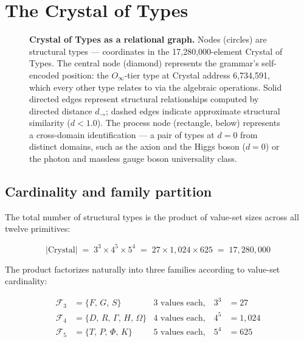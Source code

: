 \documentclass[12pt,a4paper]{article}
\begin{document}
\section{The Crystal of Types}
\label{sec:crystal}

\begin{figure}[H]
\centering
{}
\caption{\textbf{Crystal of Types as a relational graph.} Nodes
(circles) are structural types --- coordinates in the 17,280,000-element
Crystal of Types. The central node (diamond) represents the grammar's
self-encoded position: the $O_\infty$-tier type at Crystal address
6,734,591, which every other type relates to via the algebraic operations.
Solid directed edges represent structural relationships computed by
directed distance $d_\to$; dashed edges indicate approximate structural
similarity ($d < 1.0$). The process node (rectangle, below) represents
a cross-domain identification --- a pair of types at $d = 0$ from
distinct domains, such as the axion and the Higgs boson ($d = 0$) or
the photon and massless gauge boson universality class.}
\label{fig:crystal}
\end{figure}

\subsection{Cardinality and family partition}

The total number of structural types is the product of value-set sizes
across all twelve primitives:

\begin{equation}
  |\text{Crystal}| \;=\; 3^3 \times 4^5 \times 5^4
  \;=\; 27 \times 1{,}024 \times 625
  \;=\; 17{,}280{,}000
  \label{eq:crystal_size}
\end{equation}

\noindent
The product factorizes naturally into three families according to
value-set cardinality:

\begin{align}
  \mathcal{F}_3 &= \{F,\, G,\, S\}
    &\text{3 values each,} \quad 3^3 &= 27 \label{eq:f3} \\
  \mathcal{F}_4 &= \{D,\, R,\, \Gamma,\, H,\, \Omega\}
    &\text{4 values each,} \quad 4^5 &= 1{,}024 \label{eq:f4} \\
  \mathcal{F}_5 &= \{T,\, P,\, \Phi,\, K\}
    &\text{5 values each,} \quad 5^4 &= 625 \label{eq:f5}
\end{align}
\end{document}
